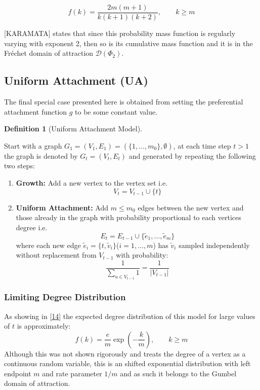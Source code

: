 \documentclass[
  10pt,
  a4paper,
]{scrreprt}
\providecommand{\tightlist}{%
  \setlength{\itemsep}{0pt}\setlength{\parskip}{0pt}}\usepackage{longtable,booktabs,array}
\theoremstyle{plain}
\theoremstyle{definition}
\newtheorem{definition}{Definition}[section]
\theoremstyle{plain}
\theoremstyle{remark}
\begin{document}
{\[
f(k) = \frac{2m(m+1)}{k(k+1)(k+2)}, \qquad k\geq m
\]

{[}KARAMATA{]} states that since this probability mass function is
regularly varying with exponent 2, then so is its cumulative mass
function and it is in the Fréchet domain of attraction
\(\mathcal D(\Phi_2)\).

\hypertarget{uniform-attachment-ua}{%
\subsection{Uniform Attachment (UA)}\label{uniform-attachment-ua}}

The final special case presented here is obtained from setting the
preferential attachment function \(g\) to be some constant value.

\begin{definition}[Uniform Attachment
Model]\protect\hypertarget{def-ua}{}\label{def-ua}

Start with a graph \(G_1 = (V_1, E_1) = (\{1,\ldots,m_0\}, \emptyset)\),
at each time step \(t>1\) the graph is denoted by \(G_t=(V_t, E_t)\) and
generated by repeating the following two steps:

\begin{enumerate}
\def\labelenumi{\arabic{enumi}.}
\tightlist
\item
  \textbf{Growth:} Add a new vertex to the vertex set i.e.~\[
  V_t=V_{t-1}\cup\{t\}
  \]
\item
  \textbf{Uniform Attachment:} Add \(m\le m_0\) edges between the new
  vertex and those already in the graph with probability proportional to
  each vertices degree i.e.~\[
  E_t  = E_{t-1} \cup \{\tilde e_1, \ldots, \tilde e_m\}
  \] where each new edge
  \(\tilde e_i = \{t, \tilde v_i\}\)(\(i=1,\ldots, m\)) has
  \(\tilde v_i\) sampled independently without replacement from
  \(V_{t-1}\) with probability: \[
  \frac{1}{\sum_{u\in V_{t-1}}1} = \frac{1}{|V_{t-1}|}
  \]
\end{enumerate}

\end{definition}

\hypertarget{limiting-degree-distribution-2}{%
\subsubsection{Limiting Degree
Distribution}\label{limiting-degree-distribution-2}}

As showing in {[}\protect\hyperlink{ref-Barabasi99}{14}{]} the expected
degree distribution of this model for large values of \(t\) is
approximately: \[
f(k) = \displaystyle\frac{e}{m}\exp\left(-\displaystyle\frac{k}{m}\right),\qquad k \ge m
\] Although this was not shown rigorously and treats the degree of a
vertex as a continuous random variable, this is an shifted exponential
distribution with left endpoint \(m\) and rate parameter \(1/m\) and as
such it belongs to the Gumbel domain of attraction.

}
\end{document}
